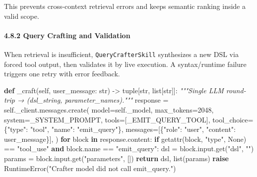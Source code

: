 \documentclass[
]{article}
\newenvironment{Shaded}{}{}
\newcommand{\BuiltInTok}[1]{\textcolor[rgb]{0.00,0.50,0.00}{#1}}
\newcommand{\CommentTok}[1]{\textcolor[rgb]{0.38,0.63,0.69}{\textit{#1}}}
\newcommand{\ControlFlowTok}[1]{\textcolor[rgb]{0.00,0.44,0.13}{\textbf{#1}}}
\newcommand{\DecValTok}[1]{\textcolor[rgb]{0.25,0.63,0.44}{#1}}
\newcommand{\KeywordTok}[1]{\textcolor[rgb]{0.00,0.44,0.13}{\textbf{#1}}}
\newcommand{\NormalTok}[1]{#1}
\newcommand{\OperatorTok}[1]{\textcolor[rgb]{0.40,0.40,0.40}{#1}}
\newcommand{\PreprocessorTok}[1]{\textcolor[rgb]{0.74,0.48,0.00}{#1}}
\newcommand{\StringTok}[1]{\textcolor[rgb]{0.25,0.44,0.63}{#1}}
\newcommand{\VariableTok}[1]{\textcolor[rgb]{0.10,0.09,0.49}{#1}}
\begin{document}
This prevents cross-context retrieval errors and keeps semantic ranking
inside a valid scope.

\paragraph{4.8.2 Query Crafting and
Validation}\label{query-crafting-and-validation}

When retrieval is insufficient, \texttt{QueryCrafterSkill} synthesizes a
new DSL via forced tool output, then validates it by live execution. A
syntax/runtime failure triggers one retry with error feedback.

\begin{Shaded}
\begin{Highlighting}[]
\KeywordTok{def}\NormalTok{ \_craft(}\VariableTok{self}\NormalTok{, user\_message: }\BuiltInTok{str}\NormalTok{) }\OperatorTok{{-}\textgreater{}} \BuiltInTok{tuple}\NormalTok{[}\BuiltInTok{str}\NormalTok{, }\BuiltInTok{list}\NormalTok{[}\BuiltInTok{str}\NormalTok{]]:}
    \CommentTok{"""Single LLM round{-}trip → \textasciigrave{}\textasciigrave{}(dsl\_string, parameter\_names)\textasciigrave{}\textasciigrave{}."""}
\NormalTok{    response }\OperatorTok{=} \VariableTok{self}\NormalTok{.\_client.messages.create(}
\NormalTok{        model}\OperatorTok{=}\VariableTok{self}\NormalTok{.\_model,}
\NormalTok{        max\_tokens}\OperatorTok{=}\DecValTok{2048}\NormalTok{,}
\NormalTok{        system}\OperatorTok{=}\NormalTok{\_SYSTEM\_PROMPT,}
\NormalTok{        tools}\OperatorTok{=}\NormalTok{[\_EMIT\_QUERY\_TOOL],}
\NormalTok{        tool\_choice}\OperatorTok{=}\NormalTok{\{}\StringTok{"type"}\NormalTok{: }\StringTok{"tool"}\NormalTok{, }\StringTok{"name"}\NormalTok{: }\StringTok{"emit\_query"}\NormalTok{\},}
\NormalTok{        messages}\OperatorTok{=}\NormalTok{[\{}\StringTok{"role"}\NormalTok{: }\StringTok{"user"}\NormalTok{, }\StringTok{"content"}\NormalTok{: user\_message\}],}
\NormalTok{    )}
    \ControlFlowTok{for}\NormalTok{ block }\KeywordTok{in}\NormalTok{ response.content:}
        \ControlFlowTok{if} \BuiltInTok{getattr}\NormalTok{(block, }\StringTok{"type"}\NormalTok{, }\VariableTok{None}\NormalTok{) }\OperatorTok{==} \StringTok{"tool\_use"} \KeywordTok{and}\NormalTok{ block.name }\OperatorTok{==} \StringTok{"emit\_query"}\NormalTok{:}
\NormalTok{            dsl }\OperatorTok{=}\NormalTok{ block.}\BuiltInTok{input}\NormalTok{.get(}\StringTok{"dsl"}\NormalTok{, }\StringTok{""}\NormalTok{)}
\NormalTok{            params }\OperatorTok{=}\NormalTok{ block.}\BuiltInTok{input}\NormalTok{.get(}\StringTok{"parameters"}\NormalTok{, [])}
            \ControlFlowTok{return}\NormalTok{ dsl, }\BuiltInTok{list}\NormalTok{(params)}
    \ControlFlowTok{raise} \PreprocessorTok{RuntimeError}\NormalTok{(}\StringTok{"Crafter model did not call emit\_query."}\NormalTok{)}
\end{Highlighting}
\end{Shaded}
\end{document}
